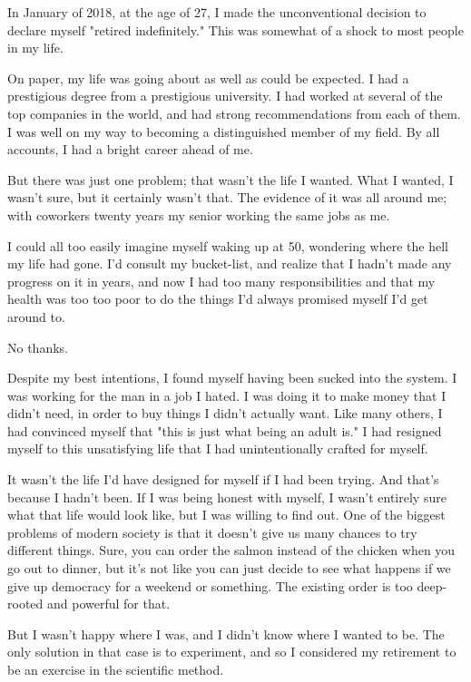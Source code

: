 \documentclass[]{book}
\begin{document}
In January of 2018, at the age of 27, I made the unconventional decision to
declare myself "retired indefinitely." This was somewhat of a shock to most
people in my life.

On paper, my life was going about as well as could be expected. I had a
prestigious degree from a prestigious university. I had worked at several of the
top companies in the world, and had strong recommendations from each of them. I
was well on my way to becoming a distinguished member of my field. By all
accounts, I had a bright career ahead of me.

But there was just one problem; that wasn't the life I wanted. What I wanted, I
wasn't sure, but it certainly wasn't that. The evidence of it was all around me;
with coworkers twenty years my senior working the same jobs as me.

I could all too easily imagine myself waking up at 50, wondering where the hell
my life had gone. I'd consult my bucket-list, and realize that I hadn't made any
progress on it in years, and now I had too many responsibilities and that my
health was too too poor to do the things I'd always promised myself I'd get
around to.

No thanks.

Despite my best intentions, I found myself having been sucked into the system. I
was working for the man in a job I hated. I was doing it to make money that I
didn't need, in order to buy things I didn't actually want. Like many others, I
had convinced myself that "this is just what being an adult is." I had resigned
myself to this unsatisfying life that I had unintentionally crafted for myself.

It wasn't the life I'd have designed for myself if I had been trying. And that's
because I hadn't been. If I was being honest with myself, I wasn't entirely sure
what that life would look like, but I was willing to find out. One of the
biggest problems of modern society is that it doesn't give us many chances to
try different things. Sure, you can order the salmon instead of the chicken when
you go out to dinner, but it's not like you can just decide to see what happens
if we give up democracy for a weekend or something. The existing order is too
deep-rooted and powerful for that.

But I wasn't happy where I was, and I didn't know where I wanted to be. The only
solution in that case is to experiment, and so I considered my retirement to be
an exercise in the scientific method.
\end{document}
